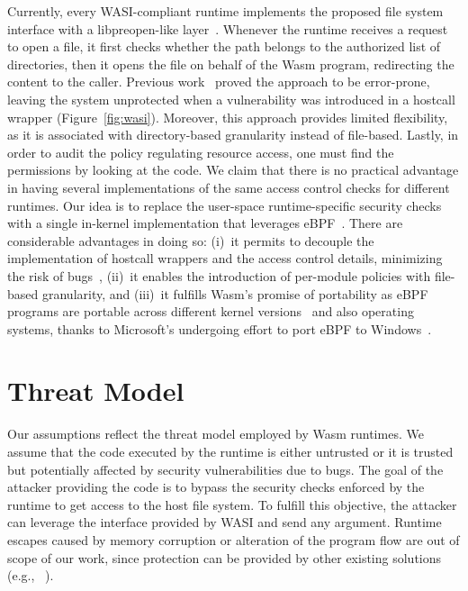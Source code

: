 Currently, every WASI-compliant runtime implements the proposed file system
interface with a libpreopen-like layer~\cite{libpreopen}. Whenever the runtime
receives a request to open a file, it first checks whether the path
belongs to the authorized list of directories, then it opens the file
on behalf of the Wasm program, redirecting the content to the caller.
Previous work~\cite{johnson2022wave,
  bosamiya2022provably, lehmann2020everything} proved the approach
to be error-prone, leaving the system unprotected when a vulnerability
was introduced in a hostcall wrapper (Figure~\ref{fig:wasi}). Moreover,
this approach provides limited flexibility, as it is associated with
directory-based granularity instead of file-based. Lastly, in order to audit
the policy regulating resource access, one must find the permissions
by looking at the code.
We claim that there is no practical advantage in having several
implementations of the same access control checks for different
runtimes. Our idea is to replace the user-space runtime-specific
security checks with a single in-kernel implementation that leverages
eBPF~\cite{bpf-lsm-hooks}.
There are considerable advantages in doing so: (i)~it permits to decouple the implementation of hostcall wrappers
and the access control details, minimizing the risk of bugs~\cite{kehoe2022ebpf,seapp, cage4deno},
(ii)~it enables the introduction of per-module policies with file-based
granularity, and (iii)~it fulfills Wasm's promise of portability as eBPF programs are portable across different kernel versions~\cite{andrii2021bpfCORE} and also operating systems, thanks
to Microsoft's undergoing effort to port eBPF to
Windows~\cite{ebpf-windows}.

\section{Threat Model}

Our assumptions reflect the threat model employed by Wasm runtimes. We
assume that the code executed by the runtime is either untrusted or it
is trusted but potentially affected by security vulnerabilities due to
bugs. The goal of the attacker providing the code is to bypass the
security checks enforced by the runtime to get access to the host file
system. To fulfill this objective, the attacker can leverage the
interface provided by WASI and send any argument. Runtime escapes
caused by memory corruption or alteration of the program flow are out
of scope of our work, since protection can be provided by other
existing solutions (e.g., ~\cite{bosamiya2022provably}).

